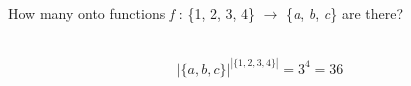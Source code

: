 How many onto functions \textit{f} : \{1, 2, 3, 4\} $\to$ \{\textit{a}, \textit{b}, \textit{c}\} are there?


\begin{solution}\ \\
\[|\{a, b, c\}|^{|\{1, 2, 3, 4\}|} = 3^4 = 36\]
\end{solution}